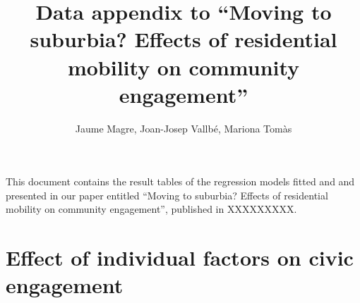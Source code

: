 \documentclass[12pt,a4paper]{article}
\begin{document}
\setlength{\droptitle}{-1em}


\title{Data appendix to ``Moving to suburbia? 
Effects of residential mobility on community
engagement''}%


\author{Jaume Magre, Joan-Josep Vallbé, Mariona Tomàs}
\providecommand{\keywords}[1]{\textbf{Keywords---} #1}
\date{}

\maketitle

\appendix

This document contains the result tables of the regression models fitted and
and presented in our paper entitled ``Moving to suburbia? 
Effects of residential mobility on community
engagement'', published in XXXXXXXXX.

\section{Effect of individual factors on civic engagement}\label{appA}
\end{document}
